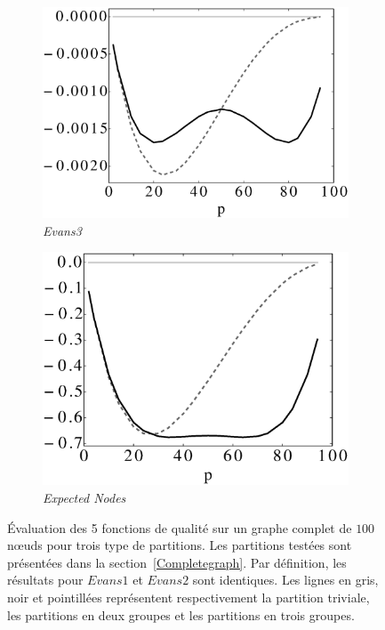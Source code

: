 \begin{figure}
	\begin{subfigure}{0.4\linewidth}
		\includegraphics[width=\linewidth]{img/ExpectedNodes/1Clique/Clique_Evans3.eps}
		\caption{\label{fig:1CE3}\emph{Evans3}}		
	\end{subfigure}\hspace*{1cm}
	\begin{subfigure}{0.4\linewidth}
		\includegraphics[width=\linewidth]{img/ExpectedNodes/1Clique/Clique_Expectednode.eps}
		\caption{\label{fig:1CMod}\emph{Expected Nodes}}		
	\end{subfigure}
		
		\caption{\'Evaluation des 5 fonctions de qualité sur un graphe complet  de $100$ n\oe uds pour trois type de partitions.
		Les partitions testées sont présentées dans la section~\ref{Completegraph}.
		Par définition, les résultats pour $Evans1$ et $Evans2$ sont identiques.
		Les lignes en gris, noir et pointillées représentent respectivement la partition triviale, les partitions en deux groupes et les partitions en trois groupes.}
		\label{fig:1Cres}
\end{figure}

